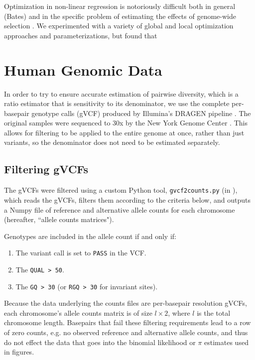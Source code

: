 \documentclass[11pt]{article}
\begin{document}
Optimization in non-linear regression is notoriously difficult both in general
(Bates) and in the specific problem of estimating the effects of genome-wide
selection \parencite{Murphy2022-sj}. We experimented with a variety of global
and local optimization approaches and parameterizations, but found that 


\section{Human Genomic Data}

In order to try to ensure accurate estimation of pairwise diversity, which is a
ratio estimator that is sensitivity to its denominator, we use the complete
per-basepair genotype calls (gVCF) produced by Illumina's DRAGEN pipeline
\parencite{Illumina_Inc2020-dk}. The original samples were sequenced to 30x by
the New York Genome Center \parencite{Byrska-Bishop2022-tn}. This allows for
filtering to be applied to the entire genome at once, rather than just
variants, so the denominator does not need to be estimated separately.

\subsection{Filtering gVCFs}
\label{supp:filter}

The gVCFs were filtered using a custom Python tool, \texttt{gvcf2counts.py} (in
), which reads the gVCFs, filters them according to
the criteria below, and outputs a Numpy  file of reference and
alternative allele counts for each chromosome (hereafter, ``allele counts
matrices").

Genotypes are included in the allele count if and only if:

\begin{enumerate}
  \item The variant call is set to \texttt{PASS} in the VCF.
  \item The \texttt{QUAL > 50}.
  \item The \texttt{GQ > 30} (or \texttt{RGQ > 30} for invariant sites).
\end{enumerate}

Because the data underlying the counts files are per-basepair resolution gVCFs,
each chromosome's allele counts matrix is of size $l \times 2$, where $l$ is
the total chromosome length. Basepairs that fail these filtering requirements
lead to a row of zero counts, e.g. no observed reference and alternative allele
counts, and thus do not effect the data that goes into the binomial likelihood
or $\pi$ estimates used in figures.
\end{document}
